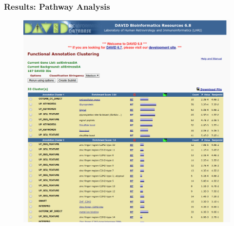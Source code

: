 \documentclass[handout]{beamer}
\begin{document}
\begin{frame}
\frametitle{Results: Pathway Analysis}
\begin{center}
	\begin{figure}[h]          
		\includegraphics[height=0.8\textheight]{images/DAVID-Analysis-DAList.png}
	\end{figure}
\end{center}
\end{frame}
\end{document}
